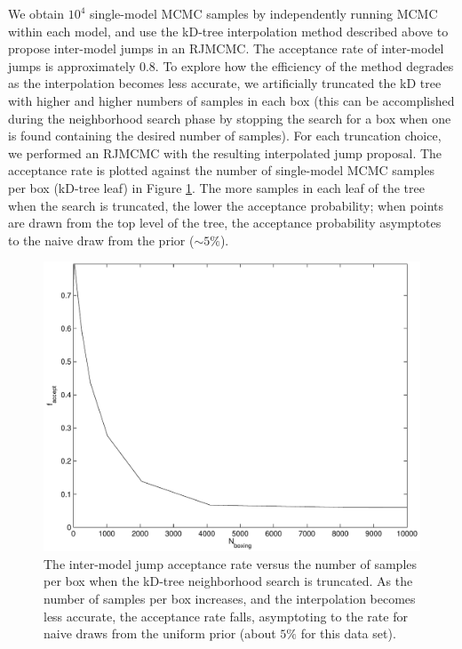 \documentclass{rsos}
\begin{document}
We obtain $10^4$ single-model MCMC samples by independently running
MCMC within each model, and use the kD-tree interpolation method
described above to propose inter-model jumps in an RJMCMC.  The
acceptance rate of inter-model jumps is approximately 0.8.  To explore
how the efficiency of the method degrades as the interpolation becomes
less accurate, we artificially truncated the kD tree with higher and
higher numbers of samples in each box (this can be accomplished during
the neighborhood search phase by stopping the search for a box when
one is found containing the desired number of samples).  For each
truncation choice, we performed an RJMCMC with the resulting
interpolated jump proposal.  The acceptance rate is plotted against
the number of single-model MCMC samples per box (kD-tree leaf) in
Figure \ref{fig:acceptRate}.  The more samples in each leaf of the tree
when the search is truncated, the lower the acceptance probability;
when points are drawn from the top level of the tree, the acceptance
probability asymptotes to the naive draw from the prior ($\sim 5\%$).

\begin{figure}
  \begin{center}
    \includegraphics[width=0.8\columnwidth]{Figure2_acceptRate}
  \end{center}
  \caption{\label{fig:acceptRate} The inter-model jump acceptance rate
    versus the number of samples per box when the kD-tree neighborhood
    search is truncated.  As the number of samples per box increases,
    and the interpolation becomes less accurate, the acceptance rate
    falls, asymptoting to the rate for naive draws from the uniform
    prior (about $5\%$ for this data set).}
\end{figure}
\end{document}
